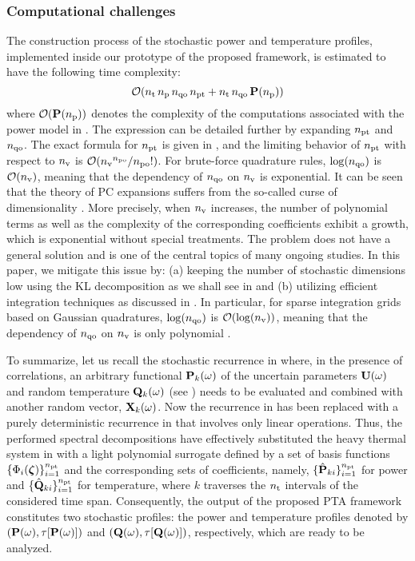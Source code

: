 \subsubsection{Computational challenges} 
The construction process of the stochastic power and temperature profiles, implemented inside our prototype of the proposed framework, is estimated to have the following time complexity:
\[
  \mathcal{O}({n_\text{t}} \, {n_\text{p}} \, {n_\text{qo}} \, {n_\text{pt}} + {n_\text{t}} \, {n_\text{qo}} \, \mathbf{P}({n_\text{p}}))
\]
where $\mathcal{O}(\mathbf{P}({n_\text{p}}))$ denotes the complexity of the computations associated with the power model in .
The expression can be detailed further by expanding ${n_\text{pt}}$ and ${n_\text{qo}}$.
The exact formula for ${n_\text{pt}}$ is given in , and the limiting behavior of ${n_\text{pt}}$ with respect to ${n_\text{v}}$ is $\mathcal{O}({n_\text{v}}^{n_\text{po}} / {n_\text{po}}!)$.
For brute-force quadrature rules, $\log({n_\text{qo}})$ is $\mathcal{O}({n_\text{v}})$, meaning that the dependency of ${n_\text{qo}}$ on ${n_\text{v}}$ is exponential.
It can be seen that the theory of PC expansions suffers from the so-called curse of dimensionality \cite{xiu2010, maitre2010, eldred2008}.
More precisely, when ${n_\text{v}}$ increases, the number of polynomial terms as well as the complexity of the corresponding coefficients exhibit a growth, which is exponential without special treatments.
The problem does not have a general solution and is one of the central topics of many ongoing studies.
In this paper, we mitigate this issue by: (a) keeping the number of stochastic dimensions low using the KL decomposition as we shall see in  and (b) utilizing efficient integration techniques as discussed in .
In particular, for sparse integration grids based on Gaussian quadratures, $\log({n_\text{qo}})$ is $\mathcal{O}(\log({n_\text{v}}))$, meaning that the dependency of ${n_\text{qo}}$ on ${n_\text{v}}$ is only polynomial \cite{heiss2008}.

To summarize, let us recall the stochastic recurrence in  where, in the presence of correlations, an arbitrary functional $\mathbf{P}_k(\omega)$ of the uncertain parameters $\mathbf{U}(\omega)$ and random temperature $\mathbf{Q}_k(\omega)$ (see ) needs to be evaluated and combined with another random vector, $\mathbf{X}_k(\omega)$.
Now the recurrence in  has been replaced with a purely deterministic recurrence in  that involves only linear operations.
Thus, the performed spectral decompositions have effectively substituted the heavy thermal system in  with a light polynomial surrogate defined by a set of basis functions $\{ \Phi_i(\boldsymbol{\zeta}) \}_{i = 1}^{n_\text{pt}}$ and the corresponding sets of coefficients, namely, $\{ \hat{\mathbf{P}}_{ki} \}_{i = 1}^{n_\text{pt}}$ for power and $\{ \hat{\mathbf{Q}}_{ki} \}_{i = 1}^{n_\text{pt}}$ for temperature, where $k$ traverses the ${n_\text{t}}$ intervals of the considered time span.
Consequently, the output of the proposed PTA framework constitutes two stochastic profiles: the power and temperature profiles denoted by $\profileP{\o}$ and $\profileT{\o}$, respectively, which are ready to be analyzed.

